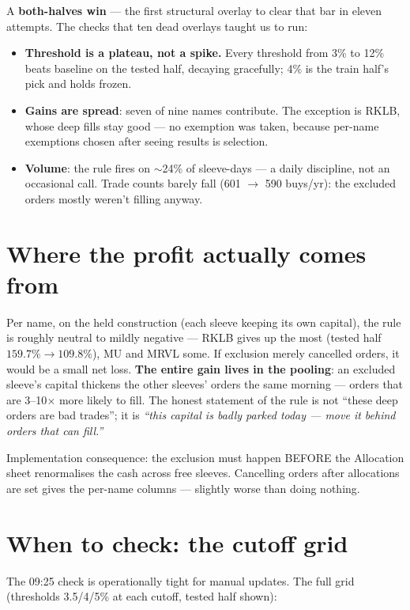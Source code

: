 \documentclass[11pt,a4paper]{article}
\newcommand{\tabnote}[1]{\begin{center}\begin{minipage}{0.92\textwidth}
  \footnotesize\color{bcgrey}#1\end{minipage}\end{center}}
\begin{document}
A \textbf{both-halves win} --- the first structural overlay to clear that bar
in eleven attempts. The checks that ten dead overlays taught us to run:

\begin{itemize}
\item \textbf{Threshold is a plateau, not a spike.} Every threshold from 3\% to
12\% beats baseline on the tested half, decaying gracefully; 4\% is the
train half's pick and holds frozen.
\item \textbf{Gains are spread}: seven of nine names contribute. The exception
is RKLB, whose deep fills stay good --- no exemption was taken, because
per-name exemptions chosen after seeing results is selection.
\item \textbf{Volume}: the rule fires on $\sim$24\% of sleeve-days --- a daily
discipline, not an occasional call. Trade counts barely fall (601
$\rightarrow$ 590 buys/yr): the excluded orders mostly weren't filling anyway.
\end{itemize}

\section{Where the profit actually comes from}

Per name, on the held construction (each sleeve keeping its own capital), the
rule is roughly neutral to mildly negative --- RKLB gives up the most (tested
half $159.7\% \rightarrow 109.8\%$), MU and MRVL some. If exclusion merely
cancelled orders, it would be a small net loss. \textbf{The entire gain lives
in the pooling}: an excluded sleeve's capital thickens the other sleeves'
orders the same morning --- orders that are 3--10$\times$ more likely to fill.
The honest statement of the rule is not ``these deep orders are bad trades'';
it is \emph{``this capital is badly parked today --- move it behind orders
that can fill.''}

\tabnote{Implementation consequence: the exclusion must happen BEFORE the
Allocation sheet renormalises the cash across free sleeves. Cancelling orders
after allocations are set gives the per-name columns --- slightly worse than
doing nothing.}

\section{When to check: the cutoff grid}

The 09:25 check is operationally tight for manual updates. The full grid
(thresholds 3.5/4/5\% at each cutoff, tested half shown):
\end{document}

